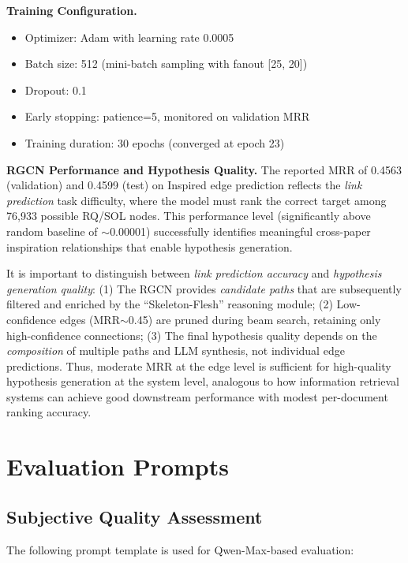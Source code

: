 \documentclass[runningheads]{llncs}
\begin{document}
\textbf{Training Configuration.} 
\begin{itemize}[leftmargin=*]
    \item Optimizer: Adam with learning rate 0.0005
    \item Batch size: 512 (mini-batch sampling with fanout [25, 20])
    \item Dropout: 0.1
    \item Early stopping: patience=5, monitored on validation MRR
    \item Training duration: 30 epochs (converged at epoch 23)
\end{itemize}

\textbf{RGCN Performance and Hypothesis Quality.} The reported MRR of 0.4563 (validation) and 0.4599 (test) on Inspired edge prediction reflects the \textit{link prediction} task difficulty, where the model must rank the correct target among 76,933 possible RQ/SOL nodes. This performance level (significantly above random baseline of $\sim$0.00001) successfully identifies meaningful cross-paper inspiration relationships that enable hypothesis generation.

It is important to distinguish between \textit{link prediction accuracy} and \textit{hypothesis generation quality}: (1) The RGCN provides \textit{candidate paths} that are subsequently filtered and enriched by the ``Skeleton-Flesh'' reasoning module; (2) Low-confidence edges (MRR$\sim$0.45) are pruned during beam search, retaining only high-confidence connections; (3) The final hypothesis quality depends on the \textit{composition} of multiple paths and LLM synthesis, not individual edge predictions. Thus, moderate MRR at the edge level is sufficient for high-quality hypothesis generation at the system level, analogous to how information retrieval systems can achieve good downstream performance with modest per-document ranking accuracy.

\section{Evaluation Prompts}
\label{app:prompts}

\subsection{Subjective Quality Assessment}

The following prompt template is used for Qwen-Max-based evaluation:
\end{document}
